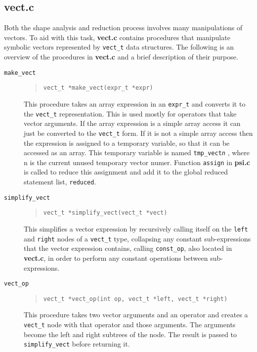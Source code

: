 \subsection{{\bf vect.c}}
Both the shape analysis and reduction process involves many manipulations
of vectors.  To aid with this task, {\bf vect.c} contains procedures
that manipulate symbolic vectors represented by {\tt vect\_t} data
structures.  The following is an overview of the
procedures in {\bf vect.c} and a brief description of their purpose.
\begin{description}

\item[{\tt make\_vect}]
\begin{quote}
\begin{verbatim}
vect_t *make_vect(expr_t *expr)
\end{verbatim}
\end{quote}
 This procedure takes an array expression in an {\tt expr\_t} and
converts it to the {\tt vect\_t} representation.  This is used mostly
for operators
that take vector arguments.  If the array expression is a simple array access
it can just be converted to the {\tt vect\_t} form.  If it is not a simple
array
access then the expression is assigned to a temporary variable, so that it
can be accessed as an array.  This temporary variable is named
{\tt tmp\_vect{\it n}}
, where n is the current unused temporary vector numer.  Function {\tt assign}
in {\bf psi.c} is called to reduce this assignment and add it to the global
reduced statement list, {\tt reduced}.

\item[{\tt simplify\_vect}]
\begin{quote}
\begin{verbatim}
vect_t *simplify_vect(vect_t *vect)
\end{verbatim}
\end{quote}
This simplifies a vector expression by recursively calling itself on
the {\tt left} and {\tt right} nodes of a {\tt vect\_t} type, collapsing
any constant sub-expressions that the vector expression contains,
calling {\tt const\_op}, also located in {\bf vect.c}, in
order to perform any constant operations between sub-expressions.

\item[{\tt vect\_op}]
\begin{quote}
\begin{verbatim}
vect_t *vect_op(int op, vect_t *left, vect_t *right)
\end{verbatim}
\end{quote}
  This procedure takes two vector arguments and an operator
and creates a {\tt vect\_t} node with that operator and those arguments.
The arguments become the left and right subtrees of the node.  The
result is passed to {\tt simplify\_vect} before returning it.


\end{description}
